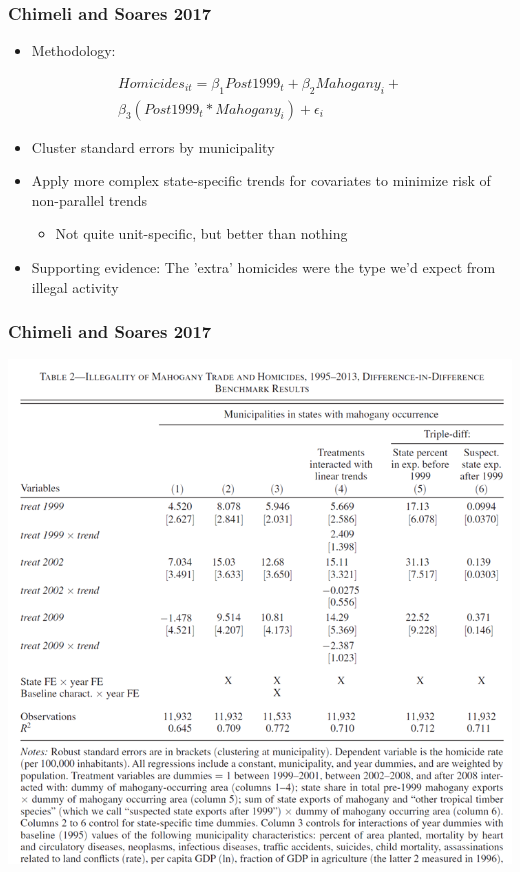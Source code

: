 \documentclass[xcolor=x11names,compress]{beamer}\usepackage[]{graphicx}\usepackage[]{color}
\renewcommand{\(}{\begin{columns}}
\renewcommand{\)}{\end{columns}}
\newcommand{\<}[1]{\begin{column}{#1}}
\renewcommand{\>}{\end{column}}
\begin{document}
\begin{frame}
\frametitle{Chimeli and Soares 2017}
\begin{itemize}
\item Methodology:
\pause
\end{itemize}
\begin{multline}
Homicides_{it} = \beta_1 Post1999_t + \beta_2 Mahogany_i + \\ \beta_3 (Post1999_t *  Mahogany_i) + \epsilon_i
\end{multline}
\pause
\begin{itemize}
\item Cluster standard errors by municipality
\pause
\item Apply more complex state-specific trends for covariates to minimize risk of non-parallel trends
\begin{itemize}
\item Not quite unit-specific, but better than nothing
\end{itemize}
\pause
\item Supporting evidence: The 'extra' homicides were the type we'd expect from illegal activity
\end{itemize}
\end{frame}

\begin{frame}
\frametitle{Chimeli and Soares 2017}
\begin{center}
\includegraphics[scale=0.35]{C_S_Results.png}
\end{center}
\end{frame}
\end{document}
